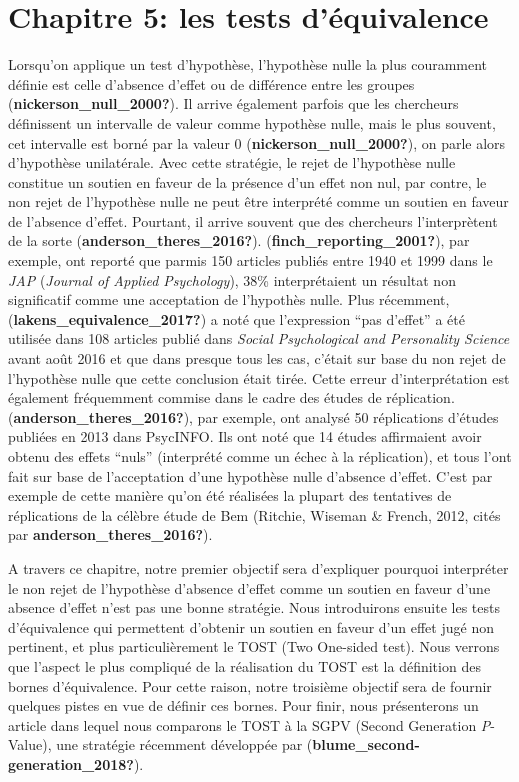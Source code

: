 \documentclass[
  english,
  man]{apa6}
\author{\phantom{0}}
\date{}
\affiliation{\phantom{0}}
\begin{document}
\hypertarget{chapitre-5-les-tests-duxe9quivalence}{%
\section{Chapitre 5: les tests d'équivalence}\label{chapitre-5-les-tests-duxe9quivalence}}

Lorsqu'on applique un test d'hypothèse, l'hypothèse nulle la plus couramment définie est celle d'absence d'effet ou de différence entre les groupes (\textbf{nickerson\_null\_2000?}). Il arrive également parfois que les chercheurs définissent un intervalle de valeur comme hypothèse nulle, mais le plus souvent, cet intervalle est borné par la valeur 0 (\textbf{nickerson\_null\_2000?}), on parle alors d'hypothèse unilatérale. Avec cette stratégie, le rejet de l'hypothèse nulle constitue un soutien en faveur de la présence d'un effet non nul, par contre, le non rejet de l'hypothèse nulle ne peut être interprété comme un soutien en faveur de l'absence d'effet. Pourtant, il arrive souvent que des chercheurs l'interprètent de la sorte (\textbf{anderson\_theres\_2016?}). (\textbf{finch\_reporting\_2001?}), par exemple, ont reporté que parmis 150 articles publiés entre 1940 et 1999 dans le \emph{JAP} (\emph{Journal of Applied Psychology}), 38\% interprétaient un résultat non significatif comme une acceptation de l'hypothès nulle. Plus récemment, (\textbf{lakens\_equivalence\_2017?}) a noté que l'expression ``pas d'effet'' a été utilisée dans 108 articles publié dans \emph{Social Psychological and Personality Science} avant août 2016 et que dans presque tous les cas, c'était sur base du non rejet de l'hypothèse nulle que cette conclusion était tirée. Cette erreur d'interprétation est également fréquemment commise dans le cadre des études de réplication. (\textbf{anderson\_theres\_2016?}), par exemple, ont analysé 50 réplications d'études publiées en 2013 dans PsycINFO. Ils ont noté que 14 études affirmaient avoir obtenu des effets ``nuls'' (interprété comme un échec à la réplication), et tous l'ont fait sur base de l'acceptation d'une hypothèse nulle d'absence d'effet. C'est par exemple de cette manière qu'on été réalisées la plupart des tentatives de réplications de la célèbre étude de Bem (Ritchie, Wiseman \& French, 2012, cités par \textbf{anderson\_theres\_2016?}).

A travers ce chapitre, notre premier objectif sera d'expliquer pourquoi interpréter le non rejet de l'hypothèse d'absence d'effet comme un soutien en faveur d'une absence d'effet n'est pas une bonne stratégie. Nous introduirons ensuite les tests d'équivalence qui permettent d'obtenir un soutien en faveur d'un effet jugé non pertinent, et plus particulièrement le TOST (Two One-sided test). Nous verrons que l'aspect le plus compliqué de la réalisation du TOST est la définition des bornes d'équivalence. Pour cette raison, notre troisième objectif sera de fournir quelques pistes en vue de définir ces bornes. Pour finir, nous présenterons un article dans lequel nous comparons le TOST à la SGPV (Second Generation \emph{P}-Value), une stratégie récemment développée par (\textbf{blume\_second-generation\_2018?}).
\end{document}
